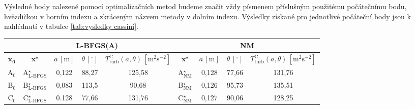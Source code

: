 Výsledné body nalezené pomocí optimalizačních metod budeme značit vždy písmenem příslušným použitému počátečnímu bodu, hvězdičkou v horním indexu a zkráceným názvem metody v dolním indexu. Výsledky získané pro jednotlivé počáteční body jsou k nahlédnutí v tabulce \ref{tab:vysledky cassini}.
\vspace{3mm}
\begin{center}
	\bgroup
\setlength\tabcolsep{3mm}
\def\arraystretch{1.7}%
\begin{tabular}{|r|cccc|cccc|}
	\hline
	& \multicolumn{4}{c|}{L-BFGS(A)} & \multicolumn{4}{c|}{NM} \\ \hline
	\multicolumn{1}{|c|}{$\mathbf{x_0}$}& $\mathbf{x^\star}$ & $ a \, [\text{m}] $ & $ \theta \, [^{\circ}]$ & $ T^{\text{C}}_{\text{turb}} (a, \theta) \, [\text{m}^{2} \text{s}^{-2}]$ & $\mathbf{x^\star}$ & $ a \, [\text{m}] $ & $ \theta \, [^{\circ}]$ & $ T^{\text{C}}_{\text{turb}} (a, \theta) \, [\text{m}^{2} \text{s}^{-2}]$  \\ \hline
	A$_0$ 		&      A$^{\star}_{\text{L-BFGS}}$          &     0,122 &     88,27 &     125{,}58    &    	A$^{\star}_{\text{NM}}$ &     0,128 &     77,66   &  131,76 \\ 
	B$_0$ 		&      B$^{\star}_{\text{L-BFGS}}$     		&     0,083 &     113,5 &     90,68    &    	B$^{\star}_{\text{NM}}$    &     0,126 &     95,73   &  135,51 \\ 
	C$_0$ 		&      C$^{\star}_{\text{L-BFGS}}$     		&     0.128 &     77,66 &     131,76    &    	C$^{\star}_{\text{NM}}$   &     0,127 &     90,06   &  128,25 \\  
	\hline
\end{tabular}
\vspace{2mm}
\label{tab:vysledky cassini}
\egroup
\end{center}

